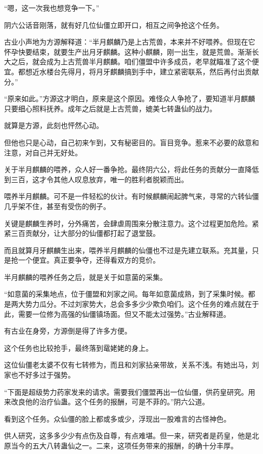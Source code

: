 \begin{this_body}
“嗯，这一次我也想竞争一下。”

阴六公话音刚落，就有好几位仙僵立即开口，相互之间争抢这个任务。

古业小声地为方源解释道：“半月麒麟乃是上古荒兽，本来并不好喂养。但现在它怀孕快要结束，就要生产出月牙麒麟。这种小麒麟，刚一出生，就是荒兽。渐渐长大之后，就会成为上古荒兽半月麒麟。咱们僵盟中许多成员，老早就瞄准了这个便宜。都想近水楼台先得月，将月牙麒麟搞到手中，建立紧密联系，然后再付出贡献分。”

“原来如此。”方源这才明白，原来是这个原因。难怪众人争抢了，要知道半月麒麟只要细心照料抚养。成年之后就是上古荒兽，媲美七转蛊仙的战力。

就算是方源，此刻也怦然心动。

但他也只是心动，自己初来乍到，又有秘密目的。盲目竞争。惹来不必要的敌意和注意，对自己并无好处。

关于半月麒麟的喂养，众人好一番争抢。最终阴六公，将此任务的贡献分一直降低到三百，这才令其他人叹息放弃，唯一的胜利者脱颖而出。

喂养半月麒麟。可不是一件轻松的伙计。有时候麒麟闹起脾气来，寻常的六转仙僵几乎架不住，甚至有受伤的例子。

关键是麒麟生养时，分外痛苦，会肆虐周围来分散注意力。这个过程更加危险。紧紧三百贡献分，让大部分的仙僵都打起了退堂鼓。

而且就算月牙麒麟生出来，喂养半月麒麟的仙僵也不过是先建立联系。充其量，只是抢一个便宜。真正要争夺，还得看双方的竞价。

半月麒麟的喂养任务之后，就是关于如意菌的采集。

“如意菌的采集地点，位于僵盟和刘家之间。每年如意菌成熟，到了采集时候。都是两大势力瓜分。不过刘家势大，总会多多少少欺负咱们。这个任务的难点就在于此，需要一位修为高强的仙僵镇场面。但又不能太过强势。”古业解释道。

有古业在身旁，方源倒是得了许多方便。

这个任务也比较抢手，最终落到鼋姥姥的身上。

这位仙僵老太婆不仅有七转修为，而且和刘家拈亲带故，关系不浅。有她出马，刘家也不好多过于强势。

“下面是超级势力药家发来的请求。需要我们僵盟再出一位仙僵，供药皇研究。用来改良他的治疗仙蛊。这个任务的报酬，可是不菲的。”阴六公道。

看到这个任务。众仙僵的脸上都或多或少，浮现出一股难言的古怪神色。

供人研究，这多多少少有点伤及自尊，有点难堪。但一来，研究者是药皇，他是北原当今的五大八转蛊仙之一。二来，这项任务带来的报酬，的确十分丰厚。


\end{this_body}
